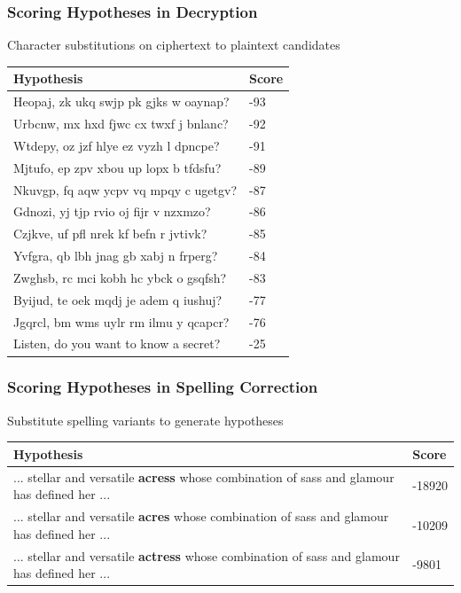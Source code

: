 \begin{frame}
\frametitle{Scoring Hypotheses in Decryption}
\centering
\begin{block}{Character substitutions on ciphertext to plaintext candidates}
\begin{tabular}{ll}
\rowcolor{MidnightBlue!50}
Hypothesis & Score \\
\hline
Heopaj, zk ukq swjp pk gjks w oaynap? & -93\\
Urbcnw, mx hxd fjwc cx twxf j bnlanc? & -92\\
Wtdepy, oz jzf hlye ez vyzh l dpncpe? & -91\\
Mjtufo, ep zpv xbou up lopx b tfdsfu? & -89\\
Nkuvgp, fq aqw ycpv vq mpqy c ugetgv? & -87\\
Gdnozi, yj tjp rvio oj fijr v nzxmzo? & -86\\
Czjkve, uf pfl nrek kf befn r jvtivk? & -85\\
Yvfgra, qb lbh jnag gb xabj n frperg? & -84\\
Zwghsb, rc mci kobh hc ybck o gsqfsh? & -83\\
Byijud, te oek mqdj je adem q iushuj? & -77\\
Jgqrcl, bm wms uylr rm ilmu y qcapcr? & -76\\
Listen, do you want to know a secret? & -25\\
\end{tabular}
\end{block}
\end{frame}

\begin{frame}
\frametitle{Scoring Hypotheses in Spelling Correction}
\centering
\begin{block}{Substitute spelling variants to generate hypotheses}
\begin{tabular}{p{8cm}l}
\rowcolor{MidnightBlue!50}
Hypothesis & Score \\
\hline
... stellar and versatile {\color{MidnightBlue}\textbf{acress}} whose combination of sass and glamour has defined her ... & -18920 \\
... stellar and versatile {\color{MidnightBlue}\textbf{acres}} whose combination of sass and glamour has defined her ... & -10209 \\
... stellar and versatile {\color{MidnightBlue}\textbf{actress}} whose combination of sass and glamour has defined her ... & -9801
\end{tabular}
\end{block}
\end{frame}

